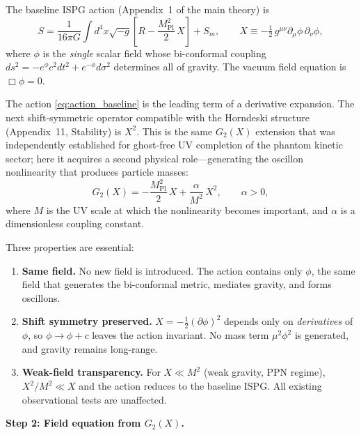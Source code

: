 \documentclass[11pt]{article}
\begin{document}
The baseline ISPG action (Appendix~1 of the main theory) is
\begin{equation}
  S = \frac{1}{16\pi G}\int d^4x\sqrt{-g}\left[
    R - \frac{M_{\mathrm{Pl}}^2}{2}\,X
  \right] + S_m,
  \qquad
  X \equiv -\tfrac{1}{2}\,g^{\mu\nu}
  \partial_\mu\phi\,\partial_\nu\phi,
  \label{eq:action_baseline}
\end{equation}
where $\phi$ is the \emph{single} scalar field whose
bi-conformal coupling
$ds^2 = -e^{\phi}c^2 dt^2 + e^{-\phi}d\sigma^2$
determines all of gravity. The vacuum field equation is
$\Box\phi = 0$.

The action \eqref{eq:action_baseline} is the leading term of a
derivative expansion. The next shift-symmetric operator compatible
with the Horndeski structure (Appendix~11, Stability) is $X^2$.
This is the same $G_2(X)$ extension that was independently
established for ghost-free UV completion of the phantom kinetic
sector; here it acquires a second physical role---generating
the oscillon nonlinearity that produces particle masses:
\begin{equation}
  \boxed{
  G_2(X) = -\frac{M_{\mathrm{Pl}}^2}{2}\,X
  + \frac{\alpha}{M^2}\,X^2,
  \qquad \alpha > 0,
  }
  \label{eq:G2X}
\end{equation}
where $M$ is the UV scale at which the nonlinearity becomes
important, and $\alpha$ is a dimensionless coupling constant.

Three properties are essential:
\begin{enumerate}
  \item \textbf{Same field.} No new field is introduced.
    The action contains only $\phi$, the same field
    that generates the bi-conformal metric, mediates
    gravity, and forms oscillons.
  \item \textbf{Shift symmetry preserved.}
    $X = -\frac{1}{2}(\partial\phi)^2$ depends only on
    \emph{derivatives} of $\phi$, so $\phi \to \phi + c$
    leaves the action invariant. No mass term
    $\mu^2\phi^2$ is generated, and gravity remains
    long-range.
  \item \textbf{Weak-field transparency.}
    For $X \ll M^2$
    (weak gravity, PPN regime), $X^2/M^2 \ll X$ and
    the action reduces to the baseline ISPG.
    All existing observational tests are unaffected.
\end{enumerate}

\medskip
\textbf{Step 2: Field equation from $G_2(X)$.}
\end{document}
